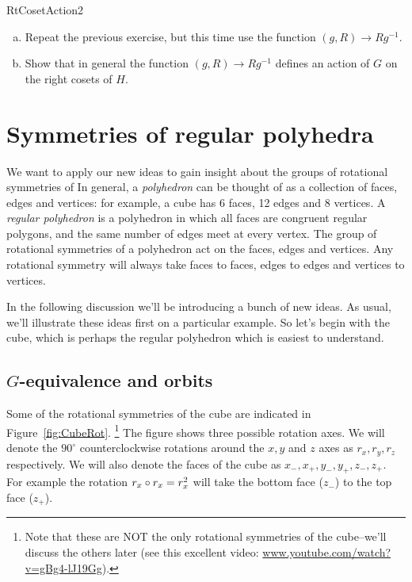 \begin{exercise}{RtCosetAction2}
\begin{enumerate}[(a)]
\item Repeat the previous exercise, but this time use the function $(g,R)\rightarrow Rg^{-1}$.
\item Show that in general the function $(g,R)\rightarrow Rg^{-1}$ defines an action of $G$ on the right cosets of $H$.  
\end {enumerate}
\end {exercise}

\section{Symmetries of regular polyhedra}\label{ActionsOnPolyhedra}
We want to apply our new ideas to gain insight about the groups of rotational symmetries of   In general, a \emph{polyhedron} can be thought of as a collection of faces, edges and vertices: for example, a cube has 6 faces, 12 edges and 8 vertices. A \emph{regular polyhedron} is a polyhedron in which all faces are congruent regular polygons, and the same number of edges meet at every vertex. The group of rotational symmetries of a polyhedron act on the faces, edges and vertices.  Any rotational symmetry will always take faces to faces, edges to edges and vertices to vertices. 

In the following discussion we'll be introducing a bunch of new ideas. As usual, we'll illustrate these ideas first on a particular example. So let's begin with the cube, which is perhaps the regular polyhedron which is easiest to understand.

\subsection{$G$-equivalence and orbits}
Some of the rotational symmetries of the cube are indicated in Figure~\ref{fig:CubeRot}.
\footnote{Note that these are NOT the only rotational symmetries of the cube--we'll discuss the others later (see  this excellent video: \url{www.youtube.com/watch?v=gBg4-lJ19Gg}).}
The figure shows three possible rotation axes. We will denote the $90^{\circ}$ counterclockwise rotations around the $x,y$ and $z$ axes as $r_x, r_y,r_z$ respectively.  We will also denote the faces of the cube as $x_-, x_+,y_-,y_+,z_-,z_+$.  For example the rotation $r_x\circ r_x=r_x^2$ will take the bottom face ($z_-$) to the top face ($z_+$). 

